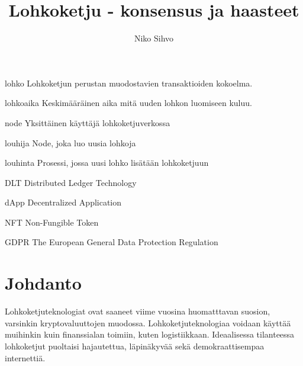 \documentclass[utf8,bachelor]{gradu3}
\begin{document}
\title{Lohkoketju - konsensus ja haasteet}
\tiivistelma{%

}
\abstract{%

}

\author{Niko Sihvo}


\maketitle


\begin{thetermlist}
\item[lohko] Lohkoketjun perustan muodostavien transaktioiden kokoelma.
\item[lohkoaika] Keskimääräinen aika mitä uuden lohkon luomiseen kuluu.
\item[node] Yksittäinen käyttäjä lohkoketjuverkossa
\item[louhija] Node, joka luo uusia lohkoja
\item[louhinta] Prosessi, jossa uusi lohko lisätään lohkoketjuun 
\item[DLT] Distributed Ledger Technology
\item[dApp] Decentralized Application
\item[NFT] Non-Fungible Token
\item[GDPR] The European General Data Protection Regulation
\end{thetermlist}

\mainmatter

\chapter{Johdanto}

Lohkoketjuteknologiat ovat saaneet viime vuosina huomatttavan suosion, varsinkin kryptovaluuttojen muodossa. Lohkoketjuteknologiaa voidaan käyttää muihinkin kuin finanssialan toimiin, kuten logistiikkaan. 
Ideaalisessa tilanteessa lohkoketjut puoltaisi hajautettua, läpinäkyvää sekä demokraattisempaa internettiä.
\end{document}
